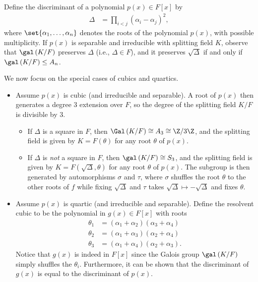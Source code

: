 \documentclass[10pt]{mypackage}
\begin{document}
Define the discriminant of a polynomial $p(x)\in F[x]$ by
\begin{align*}
  \Delta &= \prod_{i < j} \left( \alpha_i - \alpha_j \right)^2,
\end{align*}
where $\set{\alpha_1,\dots,\alpha_n}$ denotes the roots of the polynomial $p(x)$, with possible multiplicity. If $p(x)$ is separable and irreducible with splitting field $K$, observe that $\gal\left( K/F \right)$ preserves $\Delta$ (i.e., $\Delta\in F$), and it preserves $\sqrt{\Delta}$ if and only if $\gal\left( K/F \right)\leq A_n$.

We now focus on the special cases of cubics and quartics.
\begin{itemize}
  \item Assume $p(x)$ is cubic (and irreducible and separable). A root of $p(x)$ then generates a degree $3$ extension over $F$, so the degree of the splitting field $K/F$ is divisible by $3$.
    \begin{itemize}
      \item If $\Delta$ is a square in $F$, then $\Gal\left( K/F \right)\cong A_3 \cong \Z/3\Z$, and the splitting field is given by $K = F\left( \theta \right)$ for any root $\theta$ of $p(x)$.
      \item If $\Delta$ is \textit{not} a square in $F$, then $\gal\left( K/F \right)\cong S_3$, and the splitting field is given by $K = F\left( \sqrt{\Delta},\theta \right)$ for any root $\theta$ of $p(x)$. The subgroup is then generated by automorphisms $\sigma$ and $\tau$, where $\sigma$ shuffles the root $\theta$ to the other roots of $f$ while fixing $\sqrt{\Delta}$ and $\tau$ takes $\sqrt{\Delta}\mapsto -\sqrt{\Delta}$ and fixes $\theta$.
    \end{itemize}
  \item Assume $p(x)$ is quartic (and irreducible and separable). Define the resolvent cubic to be the polynomial in $g(x)\in F[x]$ with roots
    \begin{align*}
      \theta_1 &= \left( \alpha_1 + \alpha_2 \right)\left( \alpha_3 + \alpha_4 \right)\\
      \theta_2 &= \left( \alpha_1 + \alpha_3 \right)\left( \alpha_2 + \alpha_4 \right)\\
      \theta_3 &= \left( \alpha_1 + \alpha_4 \right)\left( \alpha_2 + \alpha_3 \right).
    \end{align*}
    Notice that $g(x)$ is indeed in $F[x]$ since the Galois group $\gal\left( K/F \right)$ simply shuffles the $\theta_i$. Furthermore, it can  be shown that the discriminant of $g(x)$ is equal to the discriminant of $p(x)$.


\end{itemize}
\end{document}
